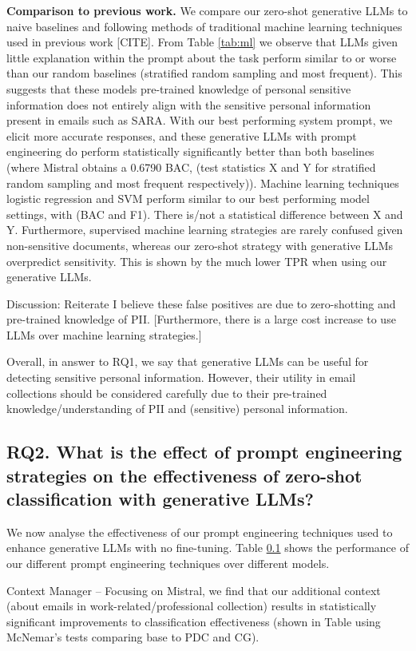 \textbf{Comparison to previous work.} We compare our zero-shot generative LLMs to naive baselines and following methods of traditional machine learning techniques used in previous work [CITE]. From Table \ref{tab:ml} we observe that LLMs given little explanation within the prompt about the task perform similar to or worse than our random baselines (stratified random sampling and most frequent). This suggests that these models pre-trained knowledge of personal sensitive information does not entirely align with the sensitive personal information present in emails such as SARA. With our best performing system prompt, we elicit more accurate responses, and these generative LLMs with prompt engineering do perform statistically significantly better than both baselines (where Mistral obtains a 0.6790 BAC, (test statistics X and Y for stratified random sampling and most frequent respectively)). Machine learning techniques logistic regression and SVM perform similar to our best performing model settings, with (BAC and F1). There is/not a statistical difference between X and Y. Furthermore, supervised machine learning strategies are rarely confused given non-sensitive documents, whereas our zero-shot strategy with generative LLMs overpredict sensitivity. This is shown by the much lower TPR when using our generative LLMs.

Discussion: Reiterate I believe these false positives are due to zero-shotting and pre-trained knowledge of PII.
[Furthermore, there is a large cost increase to use LLMs over machine learning strategies.]

Overall, in answer to RQ1, we say that generative LLMs can be useful for detecting sensitive personal information. However, their utility in email collections should be considered carefully due to their pre-trained knowledge/understanding of PII and (sensitive) personal information.

\subsection{RQ2. What is the effect of prompt engineering strategies on the effectiveness of zero-shot classification with generative LLMs?}
We now analyse the effectiveness of our prompt engineering techniques used to enhance generative LLMs with no fine-tuning. Table \ref{} shows the performance of our different prompt engineering techniques over different models.

Context Manager – Focusing on Mistral, we find that our additional context (about emails in work-related/professional collection) results in statistically significant improvements to classification effectiveness (shown in Table using McNemar’s tests comparing base to PDC and CG).

